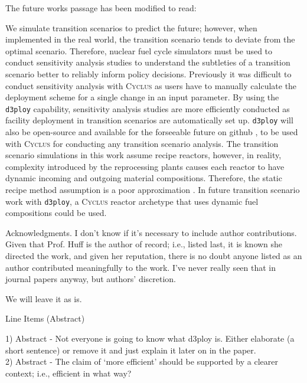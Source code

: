 \documentclass[answers,11pt]{exam}
\newcommand{\Cyclus}{\textsc{Cyclus}\xspace}%
\newcommand{\deploy}{\texttt{d3ploy}\xspace}%
\begin{document}
\begin{questions}
\begin{solution}
The future works passage has been modified to read: 

We simulate transition scenarios to predict the future; 
however, when implemented in the real world, the transition 
scenario tends to deviate from the optimal scenario.
Therefore, nuclear fuel cycle simulators must be used to conduct
sensitivity analysis studies to understand the subtleties of 
a transition scenario better to reliably inform policy decisions.
Previously it was difficult to conduct sensitivity analysis with \Cyclus 
as users have to manually calculate the deployment scheme for a 
single change in an input parameter. 
By using the \deploy capability,
sensitivity analysis studies are more efficiently 
conducted as facility deployment in transition scenarios 
are automatically set up. 
\deploy will also be open-source and available for the forseeable future on github 
\cite{chee_arfc/d3ploy:_2019}, to be used with \Cyclus for conducting any 
transition scenario analysis. 
The transition scenario simulations in this work assume recipe reactors, 
however, in reality, complexity introduced by the reprocessing plants causes 
each reactor to have dynamic incoming and outgoing material compositions. 
Therefore, the static recipe method assumption is a poor approximation 
\cite{bae_neural_2019,peterson-droogh_value_2018}. 
In future transition scenario work with \deploy, a \Cyclus 
reactor archetype that uses dynamic fuel compositions could be used. 
\end{solution}

\question Acknowledgments. I don’t know if it’s necessary to include author contributions. Given that Prof. Huff
is the author of record; i.e., listed last, it is known she directed the work, and given her reputation, there
is no doubt anyone listed as an author contributed meaningfully to the work. I’ve never really seen that
in journal papers anyway, but authors’ discretion.

\begin{solution}
        We will leave it as is. 
\end{solution}

\question Line Items (Abstract)

1) Abstract - Not everyone is going to know what d3ploy is. Either elaborate (a short sentence) or
remove it and just explain it later on in the paper. \\
2) Abstract - The claim of ‘more efficient’ should be supported by a clearer context; i.e., efficient in
what way?



\end{questions}
\end{document}
